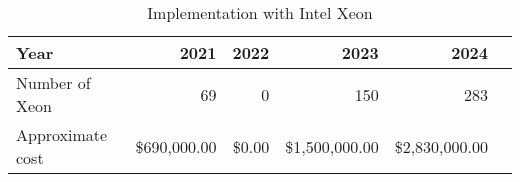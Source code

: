 \tiny \begin{longtable} { |p{}  |r  |r  |r  |r  |r |} 
\caption{Implementation with Intel Xeon \label{tab:Xeon}}\\ 
\hline 
\textbf{Year}&\textbf{2021}&\textbf{2022}&\textbf{2023}&\textbf{2024} \\ \hline
{Number of Xeon}&{69}&{0}&{150}&{283} \\ \hline
{Approximate cost}&{\$690,000.00}&{\$0.00}&{\$1,500,000.00}&{\$2,830,000.00} \\ \hline
\end{longtable} \normalsize
